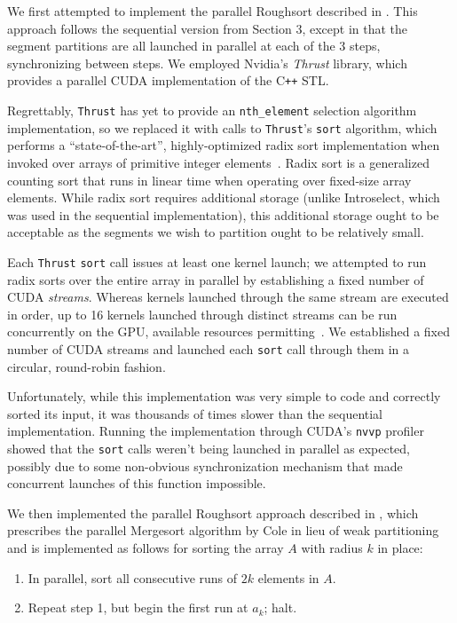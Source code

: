 \documentclass[letterpaper, 12pt]{article}
\let\supercite\cite
\renewcommand{\cite}[1]{\textnormal{~\supercite{#1}}}
\begin{document}
We first attempted to implement the parallel Roughsort described in \supercite{altman89}.
This approach follows the sequential version from Section 3, except in that the segment partitions are all launched in parallel
  at each of the 3 steps, synchronizing between steps.
We employed Nvidia's \textit{Thrust} library, which provides a parallel CUDA implementation of the C\texttt{++} STL.

Regrettably, \texttt{Thrust} has yet to provide an \texttt{nth_element} selection algorithm implementation, so we replaced it with calls
  to \texttt{Thrust}'s \texttt{sort} algorithm, which performs a ``state-of-the-art'', highly-optimized radix sort
  implementation when invoked over arrays of primitive integer elements\cite{thrustradix, leischner09}.
Radix sort is a generalized counting sort that runs in linear time when operating over fixed-size array elements.
While radix sort requires additional storage (unlike Introselect, which was used in the sequential implementation), this
  additional storage ought to be acceptable as the segments we wish to partition ought to be relatively small.

Each \texttt{Thrust} \texttt{sort} call issues at least one kernel launch; we attempted to run radix sorts over the entire array in
  parallel by establishing a fixed number of CUDA \textit{streams}.
Whereas kernels launched through the same stream are executed in order, up to 16 kernels launched through distinct streams can be
  run concurrently on the GPU, available resources permitting\cite{cuda}.
We established a fixed number of CUDA streams and launched each \texttt{sort} call through them in a circular, round-robin
  fashion.

Unfortunately, while this implementation was very simple to code and correctly sorted its input, it was thousands of times
  slower than the sequential implementation.
Running the implementation through CUDA's \texttt{nvvp} profiler showed that the \texttt{sort} calls weren't being launched in
  parallel as expected, possibly due to some non-obvious synchronization mechanism that made concurrent launches of this
  function impossible.

We then implemented the parallel Roughsort approach described in \supercite{altman90}, which prescribes the parallel Mergesort
  algorithm by Cole in lieu of weak partitioning and is implemented as follows for sorting the array $A$ with radius $k$ in
  place:
\begin{enumerate}\setlength{\itemsep}{0pt}\setlength{\parskip}{0pt}
\item In parallel, sort all consecutive runs of $2k$ elements in $A$.
\item Repeat step 1, but begin the first run at $a_k$; halt.
\end{enumerate}
\end{document}
